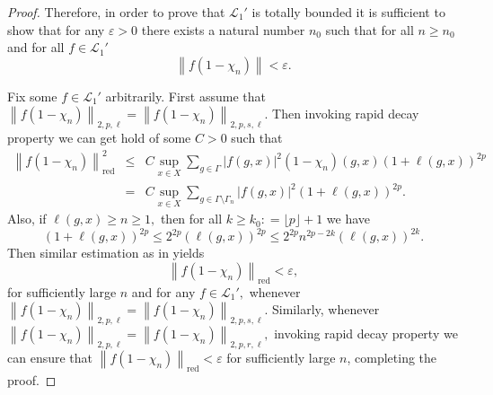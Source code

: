 \documentclass[a4paper,11pt,reqno]{amsart}
\theoremstyle{plain}
\theoremstyle{named}
\numberwithin{equation}{section}
\newcommand{\bea}{\begin{eqnarray}}
\newcommand{\eea}{\end{eqnarray}}
\newcommand{\Bea}{\begin{eqnarray*}}
\newcommand{\Eea}{\end{eqnarray*}}
\begin{document}
\begin{proof}
				
				Therefore, in order to prove that $\mathcal L_1'$ is totally bounded it is sufficient to show that for any $\varepsilon > 0$ there exists a natural number $n_0$ such that for all $n \geq n_0$ and for all $f \in \mathcal L_1'$
				$$\left\|f (1 - \chi_n) \right \| < \varepsilon.$$
				
				Fix some $f \in \mathcal L_1'$ arbitrarily. First assume that $\left \|f \left (1 - \chi_n \right ) \right \|_{2, p, \ell} = \left \|f \left (1 - \chi_n \right ) \right \|_{2, p, s, \ell}.$ Then invoking rapid decay property we can get hold of some $C > 0$ such that
				\Bea
				\left \|f \left (1 - \chi_n \right ) \right \|_{\mathrm {red}}^2 & \leq & C \sup\limits_{x \in X} \sum\limits_{g \in \Gamma} \left \lvert f (g, x) \right \rvert^2 \left (1 - \chi_n \right ) (g, x) (1 + \ell (g, x))^{2p} \\ & = & C \sup\limits_{x \in X} \sum\limits_{g \in \Gamma \setminus \Gamma_n} \left \lvert f (g, x) \right \rvert^2 (1 + \ell (g, x))^{2p}.  
				\Eea
				Also, if $\ell (g, x) \geq n \geq 1,$ then for all $k \geq k_0 : = \lfloor p \rfloor + 1$ we have 
				$$(1 + \ell (g, x))^{2p} \leq 2^{2p} (\ell (g, x))^{2p} \leq 2^{2p} n^{2p - 2k} (\ell(g, x))^{2k}.$$
				Then similar estimation as in \cite[Lemma 3.3]{Long-Wu-2017-Twisted-group-C-alg-as-CQMS} yields
				$$\left \|f \left (1 - \chi_n \right ) \right \|_{\mathrm {red}} < \varepsilon,$$ for sufficiently large $n$ and for any $f \in \mathcal L_1',$ whenever $\left \|f \left (1 - \chi_n \right ) \right \|_{2, p, \ell} = \left \|f \left (1 - \chi_n \right ) \right \|_{2, p, s, \ell}.$ Similarly, whenever $\left \|f \left (1 - \chi_n \right ) \right \|_{2, p, \ell} = \left \|f \left (1 - \chi_n \right ) \right \|_{2, p, r, \ell},$ invoking rapid decay property we can ensure that $\left \|f \left (1 - \chi_n \right ) \right \|_{\mathrm {red}} < \varepsilon$ for sufficiently large $n$, completing the proof.
			\end{proof}
			
\end{document}
